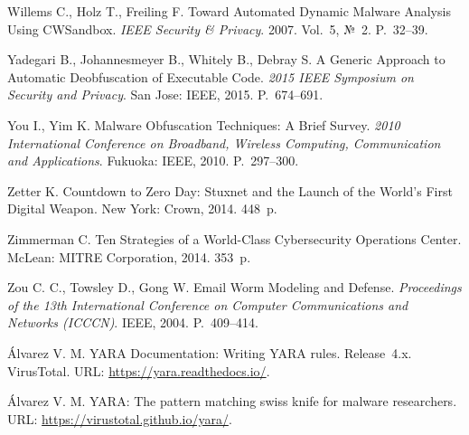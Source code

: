  Willems C., Holz T., Freiling F. Toward Automated Dynamic Malware Analysis Using CWSandbox. \emph{IEEE Security \& Privacy}. 2007. Vol.~5, №~2. P.~32--39.

 Yadegari B., Johannesmeyer B., Whitely B., Debray S. A Generic Approach to Automatic Deobfuscation of Executable Code. \emph{2015 IEEE Symposium on Security and Privacy}. San Jose: IEEE, 2015. P.~674--691.

 You I., Yim K. Malware Obfuscation Techniques: A Brief Survey. \emph{2010 International Conference on Broadband, Wireless Computing, Communication and Applications}. Fukuoka: IEEE, 2010. P.~297--300.

 Zetter K. Countdown to Zero Day: Stuxnet and the Launch of the World's First Digital Weapon. New York: Crown, 2014. 448~p.

 Zimmerman C. Ten Strategies of a World-Class Cybersecurity Operations Center. McLean: MITRE Corporation, 2014. 353~p.

 Zou C. C., Towsley D., Gong W. Email Worm Modeling and Defense. \emph{Proceedings of the 13th International Conference on Computer Communications and Networks (ICCCN)}. IEEE, 2004. P.~409--414.

 Álvarez V. M. YARA Documentation: Writing YARA rules. Release~4.x. VirusTotal. URL: \url{https://yara.readthedocs.io/}.

 Álvarez V. M. YARA: The pattern matching swiss knife for malware researchers. URL: \url{https://virustotal.github.io/yara/}.
